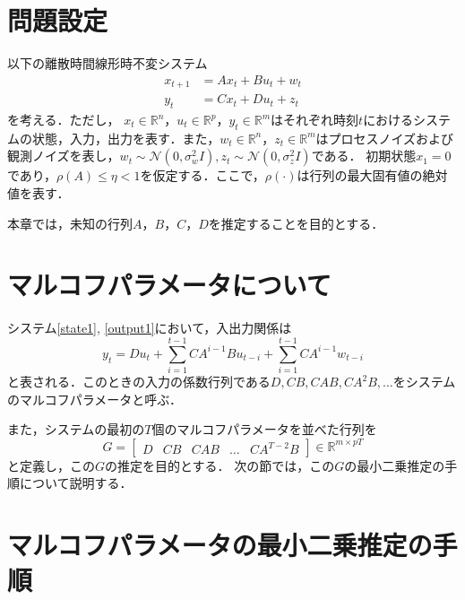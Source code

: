 \section{問題設定}
以下の離散時間線形時不変システム
\begin{align}
    \label{state1}
    x_{t+1} &= Ax_t + Bu_t + w_t \\
    \label{output1}
    y_t &= Cx_t + Du_t + z_t
\end{align}
を考える．ただし，
$x_t \in \mathbb{R}^n，u_t \in \mathbb{R}^p，y_t \in \mathbb{R}^m$はそれぞれ時刻$t$におけるシステムの状態，入力，出力を表す．また，$w_t \in \mathbb{R}^n，z_t \in \mathbb{R}^m$はプロセスノイズおよび観測ノイズを表し，$w_t \sim \mathcal{N}(0, \sigma_w^2I), z_t \sim \mathcal{N}(0, \sigma_z^2I)$である．
初期状態$x_1 = 0$であり，$\rho(A) \leq \eta <1$を仮定する．ここで，$\rho(\cdot)$は行列の最大固有値の絶対値を表す．

本章では，未知の行列$A，B，C，D$を推定することを目的とする．

\section{マルコフパラメータについて}
システム\eqref{state1}, \eqref{output1}において，入出力関係は
\begin{equation*}
    y_t = Du_t+ \sum_{i = 1}^{t-1}CA^{i-1}Bu_{t-i} + \sum_{i = 1}^{t-1}CA^{i-1}w_{t-i}
\end{equation*}
と表される．このときの入力の係数行列である$D, CB, CAB, CA^2B, \ldots$をシステムのマルコフパラメータと呼ぶ．



また，システムの最初の$T$個のマルコフパラメータを並べた行列を
\begin{equation}
    G = 
    \begin{bmatrix}
        D & CB & CAB & \ldots & CA^{T-2}B
    \end{bmatrix}
    \in \mathbb{R}^{m \times pT}
\end{equation}
と定義し，この$G$の推定を目的とする．
次の節では，この$G$の最小二乗推定の手順について説明する．

\section{マルコフパラメータの最小二乗推定の手順}

